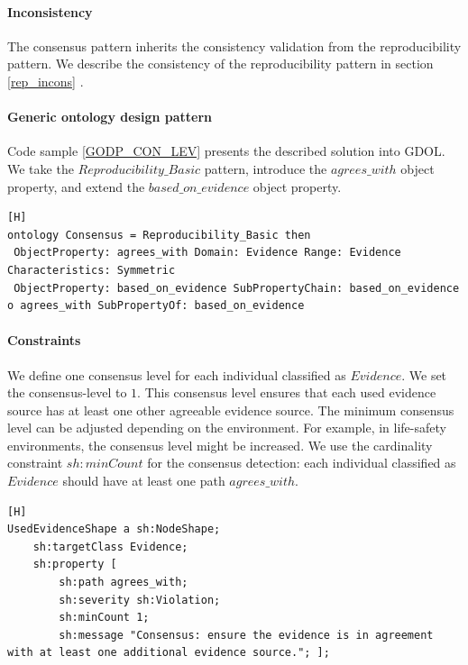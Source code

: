 \paragraph{Inconsistency}
The consensus pattern inherits the consistency validation from the reproducibility pattern. We describe the consistency of the reproducibility pattern in section \ref{rep_incons} .

\paragraph{Generic ontology design pattern}
Code sample \ref{GODP_CON_LEV} presents the described solution into GDOL. We take the $Reproducibility\_Basic$ pattern, introduce the $agrees\_with$ object property, and extend the $based\_on\_evidence$ object property. 

\begin{lstlisting}[float,language=GDOL,caption={The GDOL code that extends the reproducibility pattern and results in the consensus pattern. We take the $Reproducibility\_Basic$ pattern, introduce the $agrees\_with$ object property, and extend the $based\_on\_evidence$ object property. Figure \ref{fig:consensus} presents the generic ontology design pattern.},label={GODP_CON_LEV}][H]
ontology Consensus = Reproducibility_Basic then
 ObjectProperty: agrees_with Domain: Evidence Range: Evidence Characteristics: Symmetric
 ObjectProperty: based_on_evidence SubPropertyChain: based_on_evidence o agrees_with SubPropertyOf: based_on_evidence
\end{lstlisting}

\paragraph{Constraints}
We define one consensus level for each individual classified as $Evidence$. We set the consensus-level to $1$. This consensus level ensures that each used evidence source has at least one other agreeable evidence source. The minimum consensus level can be adjusted depending on the environment. For example, in life-safety environments, the consensus level might be increased. We use the cardinality constraint $sh:minCount$ for the consensus detection: each individual classified as $Evidence$ should have at least one path $agrees\_with$.

\begin{lstlisting}[float,language=SHACL,caption={The SHACL shapes that detect when information does not meet the minimum consensus level.},label={SHACL_CON_LEV}][H]
UsedEvidenceShape a sh:NodeShape;
	sh:targetClass Evidence; 
	sh:property [
		sh:path agrees_with; 
		sh:severity sh:Violation; 
		sh:minCount 1; 
		sh:message "Consensus: ensure the evidence is in agreement with at least one additional evidence source."; ];
\end{lstlisting}